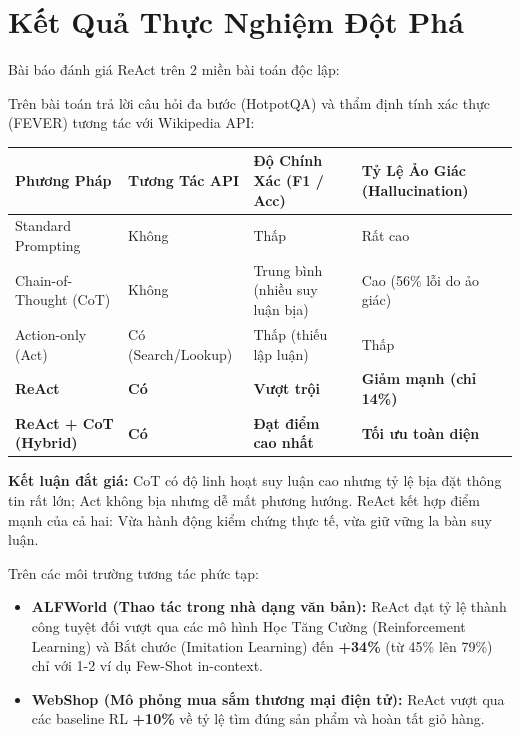 \documentclass[11pt,a4paper]{article}
\begin{document}
\section{Kết Quả Thực Nghiệm Đột Phá}

Bài báo đánh giá ReAct trên 2 miền bài toán độc lập:

\begin{benchmarkbox}
Trên bài toán trả lời câu hỏi đa bước (HotpotQA) và thẩm định tính xác thực (FEVER) tương tác với Wikipedia API:
\begin{table}[H]
\centering
\small
\begin{tabularx}{\textwidth}{lXXX}
\toprule
\textbf{Phương Pháp} & \textbf{Tương Tác API} & \textbf{Độ Chính Xác (F1 / Acc)} & \textbf{Tỷ Lệ Ảo Giác (Hallucination)} \\
\midrule
Standard Prompting & Không & Thấp & Rất cao \\
Chain-of-Thought (CoT) & Không & Trung bình (nhiều suy luận bịa) & Cao (56\% lỗi do ảo giác) \\
Action-only (Act) & Có (Search/Lookup) & Thấp (thiếu lập luận) & Thấp \\
\textbf{ReAct} & \textbf{Có} & \textbf{Vượt trội} & \textbf{Giảm mạnh (chỉ 14\%)} \\
\textbf{ReAct + CoT (Hybrid)} & \textbf{Có} & \textbf{Đạt điểm cao nhất} & \textbf{Tối ưu toàn diện} \\
\bottomrule
\end{tabularx}
\end{table}
\textbf{Kết luận đắt giá:} CoT có độ linh hoạt suy luận cao nhưng tỷ lệ bịa đặt thông tin rất lớn; Act không bịa nhưng dễ mất phương hướng. ReAct kết hợp điểm mạnh của cả hai: Vừa hành động kiểm chứng thực tế, vừa giữ vững la bàn suy luận.
\end{benchmarkbox}

\begin{benchmarkbox}
Trên các môi trường tương tác phức tạp:
\begin{itemize}[leftmargin=1.5em]
    \item \textbf{ALFWorld (Thao tác trong nhà dạng văn bản):} ReAct đạt tỷ lệ thành công tuyệt đối vượt qua các mô hình Học Tăng Cường (Reinforcement Learning) và Bắt chước (Imitation Learning) đến \textbf{+34\%} (từ 45\% lên 79\%) chỉ với 1-2 ví dụ Few-Shot in-context.
    \item \textbf{WebShop (Mô phỏng mua sắm thương mại điện tử):} ReAct vượt qua các baseline RL \textbf{+10\%} về tỷ lệ tìm đúng sản phẩm và hoàn tất giỏ hàng.
\end{itemize}
\end{benchmarkbox}
\end{document}

